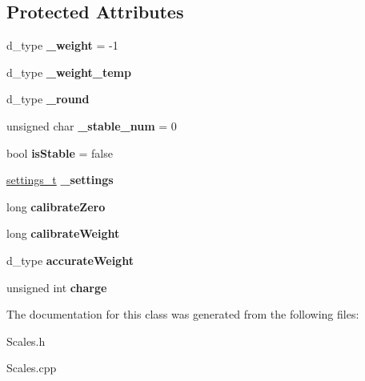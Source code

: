 \subsection*{Protected Attributes}
\begin{DoxyCompactItemize}
\item 
\hypertarget{class_scales_class_a459af92f41743c31dbbd3c2e8b925d36}{d\-\_\-type {\bfseries \-\_\-weight} = -\/1}\label{class_scales_class_a459af92f41743c31dbbd3c2e8b925d36}

\item 
\hypertarget{class_scales_class_a8dd0a4ecc6f8516d4cc250d30a3cf096}{d\-\_\-type {\bfseries \-\_\-weight\-\_\-temp}}\label{class_scales_class_a8dd0a4ecc6f8516d4cc250d30a3cf096}

\item 
\hypertarget{class_scales_class_a4d87ea8b0cb95dab98ab1854796894f6}{d\-\_\-type {\bfseries \-\_\-round}}\label{class_scales_class_a4d87ea8b0cb95dab98ab1854796894f6}

\item 
\hypertarget{class_scales_class_a91fa34e55c4acc7c675971e722cc2805}{unsigned char {\bfseries \-\_\-stable\-\_\-num} = 0}\label{class_scales_class_a91fa34e55c4acc7c675971e722cc2805}

\item 
\hypertarget{class_scales_class_a7fa749d92a93d3ed98a2709d375c6dbb}{bool {\bfseries is\-Stable} = false}\label{class_scales_class_a7fa749d92a93d3ed98a2709d375c6dbb}

\item 
\hypertarget{class_scales_class_ae2feadaa9e410a906b10542e9669ba06}{\hyperlink{structsettings__t}{settings\-\_\-t} {\bfseries \-\_\-settings}}\label{class_scales_class_ae2feadaa9e410a906b10542e9669ba06}

\item 
\hypertarget{class_scales_class_a563c677d514f67ee685048d24f0fdd0f}{long {\bfseries calibrate\-Zero}}\label{class_scales_class_a563c677d514f67ee685048d24f0fdd0f}

\item 
\hypertarget{class_scales_class_a49d9908719d0fb987f228d922b6000c5}{long {\bfseries calibrate\-Weight}}\label{class_scales_class_a49d9908719d0fb987f228d922b6000c5}

\item 
\hypertarget{class_scales_class_a20a473d2fd1a079897092b996d632878}{d\-\_\-type {\bfseries accurate\-Weight}}\label{class_scales_class_a20a473d2fd1a079897092b996d632878}

\item 
\hypertarget{class_scales_class_a1885d89686fcaded0e571a43af82e1f7}{unsigned int {\bfseries charge}}\label{class_scales_class_a1885d89686fcaded0e571a43af82e1f7}

\end{DoxyCompactItemize}


The documentation for this class was generated from the following files\-:\begin{DoxyCompactItemize}
\item 
Scales.\-h\item 
Scales.\-cpp\end{DoxyCompactItemize}
